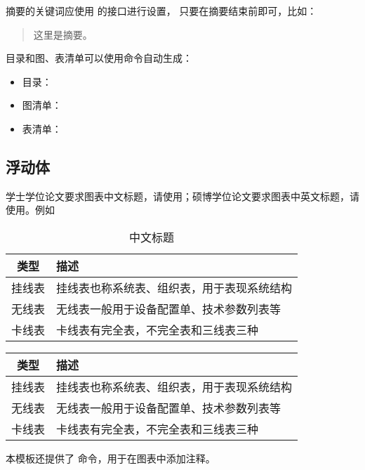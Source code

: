 \documentclass[a4paper]{ltxdoc}
\begin{document}
摘要的关键词应使用  的接口进行设置，
只要在摘要结束前即可，比如：
\begin{latex}
  \begin{abstract}
    这里是摘要。
  \end{abstract}
\end{latex}

目录和图、表清单可以使用命令自动生成：
\begin{itemize}
  \item 目录：  
  \item 图清单：
  \item 表清单：
\end{itemize}


\subsection{浮动体}

学士学位论文要求图表中文标题，请使用；硕博学位论文要求图表中英文标题，请使用。例如

\begin{table}[h]
  \centering
   \caption{中文标题} %
  \label{tab:exampletable-zh-en}
  \begin{tabular}{cl}
    \toprule
    类型   & 描述                                       \\
    \midrule
    挂线表 & 挂线表也称系统表、组织表，用于表现系统结构 \\
    无线表 & 无线表一般用于设备配置单、技术参数列表等   \\
    卡线表 & 卡线表有完全表，不完全表和三线表三种       \\
    \bottomrule
  \end{tabular}
\end{table}
\begin{table}[h]
  \centering
   \label{tab:exampletable-zh-en}
  \begin{tabular}{cl}
    \toprule
    类型   & 描述                                       \\
    \midrule
    挂线表 & 挂线表也称系统表、组织表，用于表现系统结构 \\
    无线表 & 无线表一般用于设备配置单、技术参数列表等   \\
    卡线表 & 卡线表有完全表，不完全表和三线表三种       \\
    \bottomrule
  \end{tabular}
\end{table}
\DescribeMacro{\note}
本模板还提供了  命令，用于在图表中添加注释。
\end{document}
